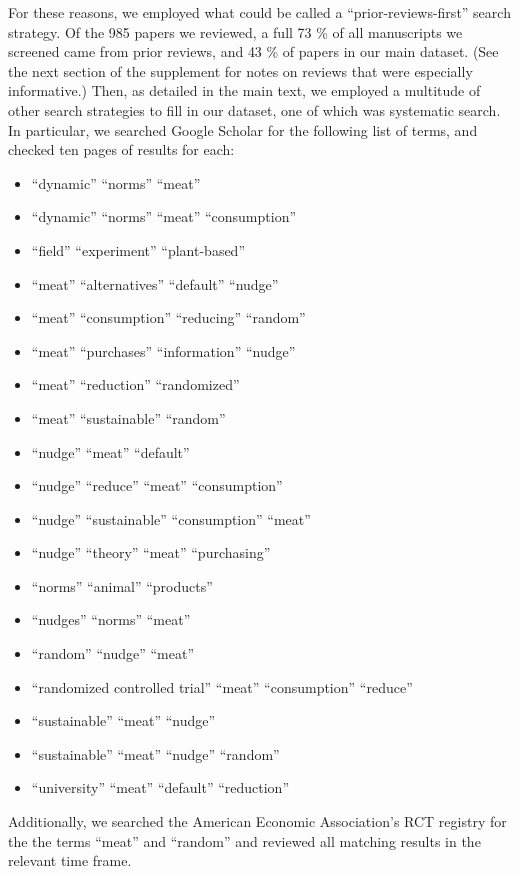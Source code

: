 \documentclass[sn-nature,referee,pdflatex]{sn-jnl}
\providecommand{\tightlist}{%
  \setlength{\itemsep}{0pt}\setlength{\parskip}{0pt}}
\begin{document}
For these reasons, we employed what could be called a
``prior-reviews-first'' search strategy. Of the 985 papers we reviewed,
a full 73 \% of all manuscripts we screened came from prior reviews, and
43 \% of papers in our main dataset. (See the next section of the
supplement for notes on reviews that were especially informative.) Then,
as detailed in the main text, we employed a multitude of other search
strategies to fill in our dataset, one of which was systematic search.
In particular, we searched Google Scholar for the following list of
terms, and checked ten pages of results for each:

\begin{itemize}
\tightlist
\item
  ``dynamic'' ``norms'' ``meat''
\item
  ``dynamic'' ``norms'' ``meat'' ``consumption''
\item
  ``field'' ``experiment'' ``plant-based''
\item
  ``meat'' ``alternatives'' ``default'' ``nudge''
\item
  ``meat'' ``consumption'' ``reducing'' ``random''
\item
  ``meat'' ``purchases'' ``information'' ``nudge''
\item
  ``meat'' ``reduction'' ``randomized''
\item
  ``meat'' ``sustainable'' ``random''
\item
  ``nudge'' ``meat'' ``default''
\item
  ``nudge'' ``reduce'' ``meat'' ``consumption''
\item
  ``nudge'' ``sustainable'' ``consumption'' ``meat''
\item
  ``nudge'' ``theory'' ``meat'' ``purchasing''
\item
  ``norms'' ``animal'' ``products''
\item
  ``nudges'' ``norms'' ``meat''
\item
  ``random'' ``nudge'' ``meat''
\item
  ``randomized controlled trial'' ``meat'' ``consumption'' ``reduce''
\item
  ``sustainable'' ``meat'' ``nudge''
\item
  ``sustainable'' ``meat'' ``nudge'' ``random''
\item
  ``university'' ``meat'' ``default'' ``reduction''
\end{itemize}

Additionally, we searched the American Economic Association's RCT
registry for the the terms ``meat'' and ``random'' and reviewed all
matching results in the relevant time frame.
\end{document}
